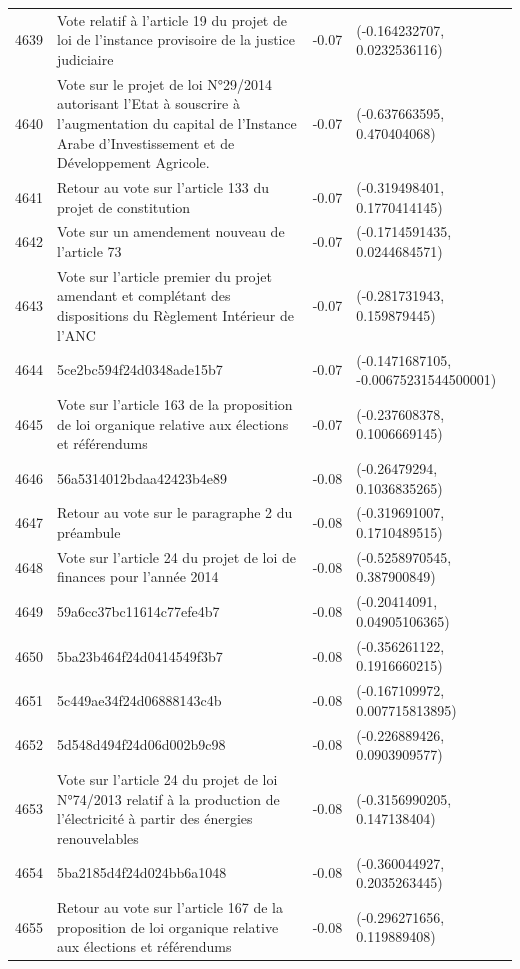 \begin{table}[ht]
\begin{tabular}{rlrl}
  4639 & Vote relatif à l'article 19 du projet de loi de l'instance provisoire de la justice judiciaire & -0.07 & (-0.164232707, 0.0232536116) \\ 
  4640 & Vote sur le projet de loi N°29/2014 autorisant l'Etat à souscrire à l'augmentation du capital de l'Instance Arabe d'Investissement et de Développement Agricole. & -0.07 & (-0.637663595, 0.470404068) \\ 
  4641 & Retour au vote sur l'article 133 du projet de constitution & -0.07 & (-0.319498401, 0.1770414145) \\ 
  4642 & Vote sur un amendement nouveau de l'article 73 & -0.07 & (-0.1714591435, 0.0244684571) \\ 
  4643 & Vote sur l'article premier du projet amendant et complétant des dispositions du Règlement Intérieur de l'ANC & -0.07 & (-0.281731943, 0.159879445) \\ 
  4644 & 5ce2bc594f24d0348ade15b7 & -0.07 & (-0.1471687105, -0.00675231544500001) \\ 
  4645 & Vote sur l'article 163 de la proposition de loi organique relative aux élections et référendums & -0.07 & (-0.237608378, 0.1006669145) \\ 
  4646 & 56a5314012bdaa42423b4e89 & -0.08 & (-0.26479294, 0.1036835265) \\ 
  4647 & Retour au vote sur le paragraphe 2 du préambule & -0.08 & (-0.319691007, 0.1710489515) \\ 
  4648 & Vote sur l'article 24 du projet de loi de finances pour l'année 2014 & -0.08 & (-0.5258970545, 0.387900849) \\ 
  4649 & 59a6cc37bc11614c77efe4b7 & -0.08 & (-0.20414091, 0.04905106365) \\ 
  4650 & 5ba23b464f24d0414549f3b7 & -0.08 & (-0.356261122, 0.1916660215) \\ 
  4651 & 5c449ae34f24d06888143c4b & -0.08 & (-0.167109972, 0.007715813895) \\ 
  4652 & 5d548d494f24d06d002b9c98 & -0.08 & (-0.226889426, 0.0903909577) \\ 
  4653 & Vote sur l'article 24 du projet de loi N°74/2013 relatif à la production de l'électricité à partir des énergies renouvelables & -0.08 & (-0.3156990205, 0.147138404) \\ 
  4654 & 5ba2185d4f24d024bb6a1048 & -0.08 & (-0.360044927, 0.2035263445) \\ 
  4655 & Retour au vote sur l'article 167 de la proposition de loi organique relative aux élections et référendums & -0.08 & (-0.296271656, 0.119889408) \\ 

\end{tabular}
\end{table}
